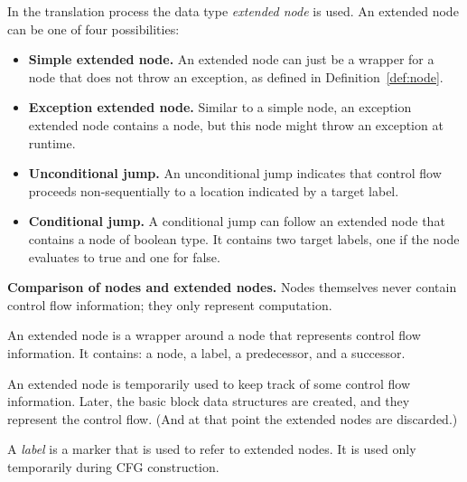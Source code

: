 \begin{definition}
    In the translation process the data type \emph{extended node} is used.
    An extended node can be one of four possibilities:
    \begin{itemize}
        \item \textbf{Simple extended node.} An extended node can just be a
          wrapper for a node that does not throw an exception,
          as defined in Definition~\ref{def:node}.
        \item \textbf{Exception extended node.} Similar to a simple
          node, an exception extended node contains a node, but this
          node might throw an exception at runtime.
        \item \textbf{Unconditional jump.} An unconditional jump
          indicates that control flow proceeds non-sequentially to a
          location indicated by a target label.
        \item \textbf{Conditional jump.} A conditional jump can follow
          an extended node that contains a node of boolean type. It
          contains two target labels, one if the node evaluates to
          true and one for false.
    \end{itemize}
\end{definition}

\textbf{Comparison of nodes and extended nodes.}
Nodes themselves never contain control flow information; they only
represent computation.

An extended node is a wrapper around a node that represents control flow
information.  It contains:  a node, a label, a predecessor, and a
successor.

An extended node is temporarily used to keep track of some control flow
information.  Later, the basic block data structures are created, and they
represent the control flow.  (And at that point the extended nodes are
discarded.)
\begin{definition}[Label]
    A \emph{label} is a marker that is used to refer to extended
    nodes. It is used only temporarily during CFG construction.
\end{definition}



